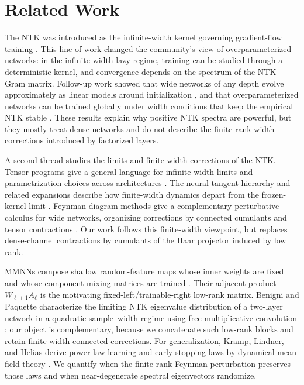 \documentclass{article}
\begin{document}
\section{Related Work}
The NTK was introduced as the infinite-width kernel governing gradient-flow training \citep{Jacot2018}. This line of work changed the community's view of overparameterized networks: in the infinite-width lazy regime, training can be studied through a deterministic kernel, and convergence depends on the spectrum of the NTK Gram matrix. Follow-up work showed that wide networks of any depth evolve approximately as linear models around initialization \citep{Lee2019}, and that overparameterized networks can be trained globally under width conditions that keep the empirical NTK stable \citep{Du2019,AllenZhu2019,Arora2019}. These results explain why positive NTK spectra are powerful, but they mostly treat dense networks and do not describe the finite rank-width corrections introduced by factorized layers.

A second thread studies the limits and finite-width corrections of the NTK. Tensor programs give a general language for infinite-width limits and parametrization choices across architectures \citep{Yang2019,Yang2021}. The neural tangent hierarchy and related expansions describe how finite-width dynamics depart from the frozen-kernel limit \citep{Huang2020}. Feynman-diagram methods give a complementary perturbative calculus for wide networks, organizing corrections by connected cumulants and tensor contractions \citep{DyerGurAri2019,FeynmanNTK2026}. Our work follows this finite-width viewpoint, but replaces dense-channel contractions by cumulants of the Haar projector induced by low rank.

MMNNs compose shallow random-feature maps whose inner weights are fixed and whose component-mixing matrices are trained \citep{MMNN2024}.  Their adjacent product \(W_{\ell+1}A_\ell\) is the motivating fixed-left/trainable-right low-rank matrix.  Benigni and Paquette characterize the limiting NTK eigenvalue distribution of a two-layer network in a quadratic sample--width regime using free multiplicative convolution \citep{BenigniPaquette2025}; our object is complementary, because we concatenate such low-rank blocks and retain finite-width connected corrections.  For generalization, Kramp, Lindner, and Helias derive power-law learning and early-stopping laws by dynamical mean-field theory \citep{KrampLindnerHelias2026}.  We quantify when the finite-rank Feynman perturbation preserves those laws and when near-degenerate spectral eigenvectors randomize.
\end{document}
